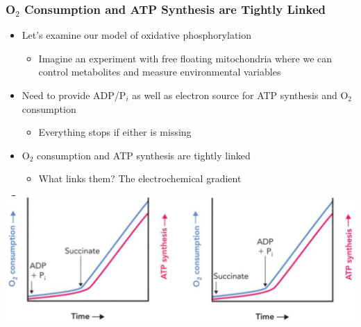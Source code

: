 \documentclass[10pt]{article}
\begin{document}
\subsubsection*{O$_2$ Consumption and ATP Synthesis are Tightly Linked}
\begin{itemize}
	\item Let's examine our model of oxidative phosphorylation
	\begin{itemize}
        \item Imagine an experiment with free floating mitochondria where we can control metabolites and measure environmental variables
    \end{itemize}
    \item Need to provide ADP/P$_i$ as well as electron source for ATP synthesis and O$_2$ consumption
    \begin{itemize}
        \item Everything stops if either is missing
    \end{itemize}
    \item O$_2$ consumption and ATP synthesis are tightly linked
    \begin{itemize}
        \item What links them?  The electrochemical gradient
    \end{itemize}
\end{itemize}
\begin{center} 
	\includegraphics*[width=\textwidth]{L3_6.png}
\end{center}
\end{document}
